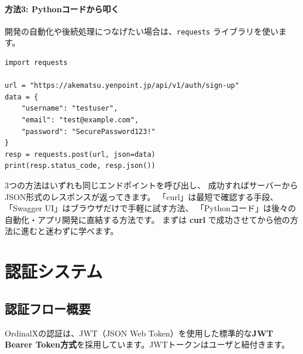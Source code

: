 \documentclass[11pt,a4paper]{ltjsarticle}  %
\begin{document}
\paragraph{方法3: Pythonコードから叩く}
開発の自動化や後続処理につなげたい場合は、\texttt{requests} ライブラリを使います。

\begin{lstlisting}[style=pythonStyle]
import requests

url = "https://akematsu.yenpoint.jp/api/v1/auth/sign-up"
data = {
    "username": "testuser",
    "email": "test@example.com",
    "password": "SecurePassword123!"
}
resp = requests.post(url, json=data)
print(resp.status_code, resp.json())
\end{lstlisting}

\begin{tcolorbox}[colback=yellow!10,colframe=orange!50!black,title=レスポンスはJSON形式]
 3つの方法はいずれも同じエンドポイントを呼び出し、
成功すればサーバーからJSON形式のレスポンスが返ってきます。
「curl」は最短で確認する手段、「Swagger UI」はブラウザだけで手軽に試す方法、
「Pythonコード」は後々の自動化・アプリ開発に直結する方法です。
まずは \textbf{curl} で成功させてから他の方法に進むと迷わずに学べます。
\end{tcolorbox}


\section{認証システム}

\subsection{認証フロー概要}
OrdinalXの認証は、JWT（JSON Web Token）を使用した標準的な\textbf{JWT Bearer Token方式}を採用しています。JWTトークンはユーザと紐付きます。
\end{document}
